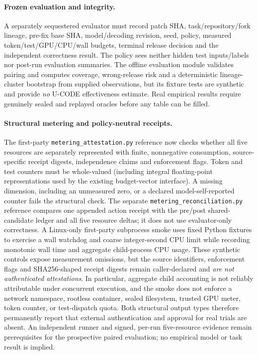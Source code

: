 \documentclass[pdflatex,sn-basic]{sn-jnl}
\begin{document}
\paragraph{Frozen evaluation and integrity.}
A separately sequestered evaluator must record patch SHA,
task/repository/fork lineage, pre-fix base SHA, model/decoding
revision, seed, policy, measured token/test/GPU/CPU/wall
budgets, terminal release decision and the independent
correctness result. The policy sees neither hidden test
inputs/labels nor post-run evaluation summaries. The offline
evaluation module validates pairing and computes coverage,
wrong-release risk and a deterministic lineage-cluster
bootstrap from supplied observations, but its fixture tests
are synthetic and provide \emph{no} U-CODE effectiveness
estimate. Real empirical results require genuinely sealed
and replayed oracles before any table can be filled.

\paragraph{Structural metering and policy-neutral receipts.}
The first-party \texttt{metering\_attestation.py} reference now checks
whether all five resources are separately represented with finite,
nonnegative consumption, source-specific receipt digests,
independence claims and enforcement flags. Token and test counters
must be whole-valued (including integral floating-point representations
used by the existing budget-vector interface). A missing dimension,
including an unmeasured zero, or a declared model-self-reported counter
fails the structural check. The separate
\texttt{metering\_reconciliation.py} reference compares one appended
action receipt with the pre/post shared-candidate ledger and all five
resource deltas; it does not use evaluator-only correctness.
A Linux-only first-party subprocess smoke uses fixed Python fixtures
to exercise a wall watchdog and coarse integer-second CPU limit while
recording monotonic wall time and aggregate child-process CPU usage.
These synthetic controls expose measurement omissions, but the
source identifiers, enforcement flags and SHA256-shaped receipt digests
remain caller-declared and \emph{are not authenticated attestations}.
In particular, aggregate child accounting is not reliably attributable
under concurrent execution, and the smoke does not enforce a network
namespace, rootless container, sealed filesystem, trusted GPU meter,
token counter, or test-dispatch quota. Both structural output types
therefore permanently report that external authentication and approval
for real trials are absent. An independent runner and signed, per-run
five-resource evidence remain prerequisites for the prospective paired
evaluation; no empirical model or task result is implied.
\end{document}
